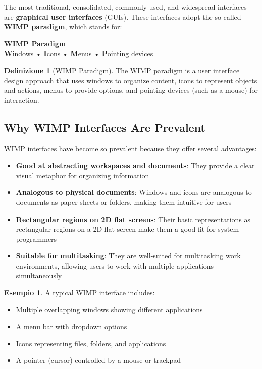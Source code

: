\documentclass[11pt,a4paper]{article}
\theoremstyle{definition}
\newtheorem{definition}{Definizione}[section]
\newtheorem{example}{Esempio}[section]
\theoremstyle{plain}
\theoremstyle{remark}
\begin{document}
The most traditional, consolidated, commonly used, and widespread interfaces are \textbf{graphical user interfaces} (GUIs). These interfaces adopt the so-called \textbf{WIMP paradigm}, which stands for:

\begin{center}
\colorbox{blue!15}{\parbox{0.85\textwidth}{
\centering
\textbf{WIMP Paradigm}\\[0.2cm]
\textbf{W}indows • \textbf{I}cons • \textbf{M}enus • \textbf{P}ointing devices
}}
\end{center}

\begin{definition}[WIMP Paradigm]
The WIMP paradigm is a user interface design approach that uses windows to organize content, icons to represent objects and actions, menus to provide options, and pointing devices (such as a mouse) for interaction.
\end{definition}

\subsection{Why WIMP Interfaces Are Prevalent}

WIMP interfaces have become so prevalent because they offer several advantages:

\begin{itemize}
    \item \textbf{Good at abstracting workspaces and documents}: They provide a clear visual metaphor for organizing information
    \item \textbf{Analogous to physical documents}: Windows and icons are analogous to documents as paper sheets or folders, making them intuitive for users
    \item \textbf{Rectangular regions on 2D flat screens}: Their basic representations as rectangular regions on a 2D flat screen make them a good fit for system programmers
    \item \textbf{Suitable for multitasking}: They are well-suited for multitasking work environments, allowing users to work with multiple applications simultaneously
\end{itemize}

\begin{example}
A typical WIMP interface includes:
\begin{itemize}
    \item Multiple overlapping windows showing different applications
    \item A menu bar with dropdown options
    \item Icons representing files, folders, and applications
    \item A pointer (cursor) controlled by a mouse or trackpad
\end{itemize}
\end{example}
\end{document}
